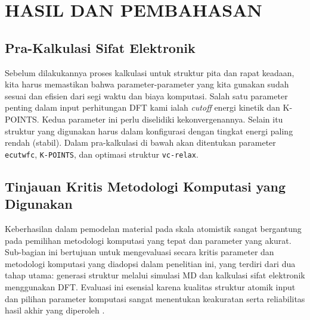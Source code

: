 \renewcommand{\thechapter}{\Roman{chapter}}
\chapter{HASIL DAN PEMBAHASAN}
\renewcommand{\thechapter}{\arabic{chapter}}

\section{Pra-Kalkulasi Sifat Elektronik}
Sebelum dilakukannya proses kalkulasi untuk struktur pita dan rapat keadaan, kita harus memastikan bahwa parameter-parameter yang kita gunakan sudah sesuai dan efisien dari segi waktu dan biaya komputasi. Salah satu parameter penting dalam input perhitungan DFT kami ialah \textit{cutoff} energi kinetik dan K-POINTS. Kedua parameter ini perlu diselidiki kekonvergenannya. Selain itu struktur yang digunakan harus dalam konfigurasi dengan tingkat energi paling rendah (stabil). Dalam pra-kalkulasi di bawah akan ditentukan parameter \texttt{ecutwfc}, \texttt{K-POINTS}, dan optimasi struktur \texttt{vc-relax}.\nocite{Giannozzi_2017}\nocite{giannozzi2020quantum}

\section{Tinjauan Kritis Metodologi Komputasi yang Digunakan}
\label{sec:metodologi_kritis}
Keberhasilan dalam pemodelan material pada skala atomistik sangat bergantung pada pemilihan metodologi komputasi yang tepat dan parameter yang akurat. Sub-bagian ini bertujuan untuk mengevaluasi secara kritis parameter dan metodologi komputasi yang diadopsi dalam penelitian ini, yang terdiri dari dua tahap utama: generasi struktur melalui simulasi MD dan kalkulasi sifat elektronik menggunakan DFT. Evaluasi ini esensial karena kualitas struktur atomik input dan pilihan parameter komputasi sangat menentukan keakuratan serta reliabilitas hasil akhir yang diperoleh \cite{[1, 1]}.

